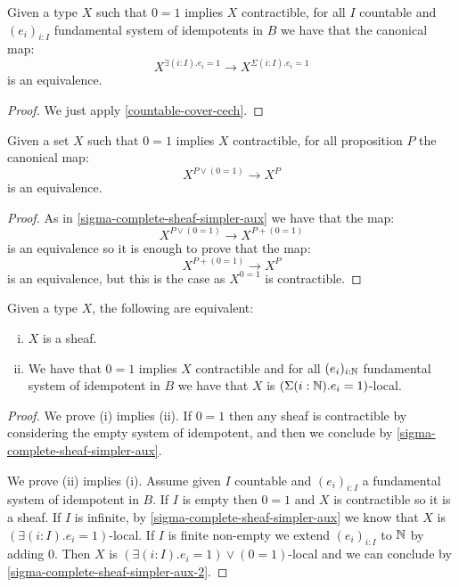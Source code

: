 \begin{lemma}\label{sigma-complete-sheaf-simpler-aux}
Given a type $X$ such that $0=1$ implies $X$ contractible, for all $I$ countable and $(e_i)_{i:I}$ fundamental system of idempotents in $B$ we have that the canonical map:
\[X^{\exists(i:I). e_i=1} \to X^{\Sigma(i:I). e_i=1}  \]
is an equivalence.
\end{lemma}

\begin{proof}
We just apply \cref{countable-cover-cech}.
\end{proof}

\begin{lemma}\label{sigma-complete-sheaf-simpler-aux-2}
Given a set $X$ such that $0=1$ implies $X$ contractible, for all proposition $P$ the canonical map:
\[X^{P\lor (0=1)} \to X^P\]
is an equivalence.
\end{lemma}

\begin{proof}
As in \cref{sigma-complete-sheaf-simpler-aux} we have that the map:
\[X^{P\lor(0=1)}\to X^{P+(0=1)}\]
is an equivalence so it is enough to prove that the map:
\[X^{P+ (0=1)} \to X^P\]
is an equivalence, but this is the case as $X^{0=1}$ is contractible.
\end{proof}

\begin{lemma}\label{sigma-complete-sheaf-simpler}
Given a type $X$, the following are equivalent:
\begin{enumerate}[(i)]
\item $X$ is a sheaf.
\item We have that $0=1$ implies $X$ contractible and for all $(e_i)_{i:\mathbb{N}}$ fundamental system of idempotent in $B$ we have that $X$ is $(\Sigma(i:\mathbb{N}). e_i=1)$-local.
\end{enumerate}
\end{lemma}

\begin{proof}
We prove (i) implies (ii). If $0=1$ then any sheaf is contractible by considering the empty system of idempotent, and then we conclude by \cref{sigma-complete-sheaf-simpler-aux}.

We prove (ii) implies (i). Assume given $I$ countable and $(e_i)_{i:I}$ a fundamental system of idempotent in $B$. If $I$ is empty then $0=1$ and $X$ is contractible so it is a sheaf. If $I$ is infinite, by \cref{sigma-complete-sheaf-simpler-aux} we know that $X$ is $(\exists(i:I). e_i=1)$-local. If $I$ is finite non-empty we extend $(e_i)_{i:I}$ to $\mathbb{N}$ by adding $0$. Then $X$ is $(\exists(i:I).e_i=1) \lor (0=1)$-local and we can conclude by \cref{sigma-complete-sheaf-simpler-aux-2}.
\end{proof}

